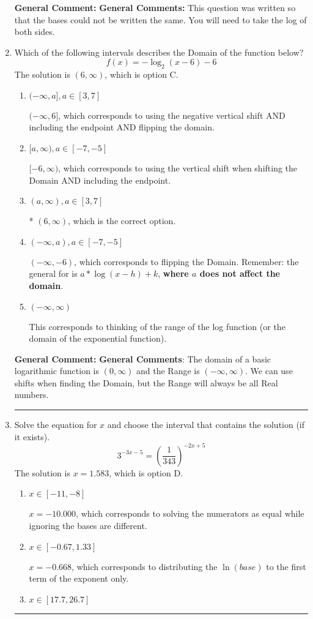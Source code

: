 \documentclass{extbook}[14pt]
\newcommand{\litem}[1]{\item #1

\rule{\textwidth}{0.4pt}}
\begin{document}
\begin{enumerate}
{\textbf{General Comment:} \textbf{General Comments:} This question was written so that the bases could not be written the same. You will need to take the log of both sides.
}
\litem{
Which of the following intervals describes the Domain of the function below?
\[ f(x) = -\log_2{(x-6)}-6 \]The solution is \( (6, \infty) \), which is option C.\begin{enumerate}[label=\Alph*.]
\item \( (-\infty, a], a \in [3, 7] \)

$(-\infty, 6]$, which corresponds to using the negative vertical shift AND including the endpoint AND flipping the domain.
\item \( [a, \infty), a \in [-7, -5] \)

$[-6, \infty)$, which corresponds to using the vertical shift when shifting the Domain AND including the endpoint.
\item \( (a, \infty), a \in [3, 7] \)

* $(6, \infty)$, which is the correct option.
\item \( (-\infty, a), a \in [-7, -5] \)

$(-\infty, -6)$, which corresponds to flipping the Domain. Remember: the general for is $a*\log(x-h)+k$, \textbf{where $a$ does not affect the domain}.
\item \( (-\infty, \infty) \)

This corresponds to thinking of the range of the log function (or the domain of the exponential function).
\end{enumerate}

\textbf{General Comment:} \textbf{General Comments}: The domain of a basic logarithmic function is $(0, \infty)$ and the Range is $(-\infty, \infty)$. We can use shifts when finding the Domain, but the Range will always be all Real numbers.
}
\litem{
Solve the equation for $x$ and choose the interval that contains the solution (if it exists).
\[ 3^{-3x-5} = \left(\frac{1}{343}\right)^{-2x+5} \]The solution is \( x = 1.583 \), which is option D.\begin{enumerate}[label=\Alph*.]
\item \( x \in [-11, -8] \)

$x = -10.000$, which corresponds to solving the numerators as equal while ignoring the bases are different.
\item \( x \in [-0.67, 1.33] \)

$x = -0.668$, which corresponds to distributing the $\ln(base)$ to the first term of the exponent only.
\item \( x \in [17.7, 26.7] \)


\end{enumerate}}
\end{enumerate}
\end{document}
